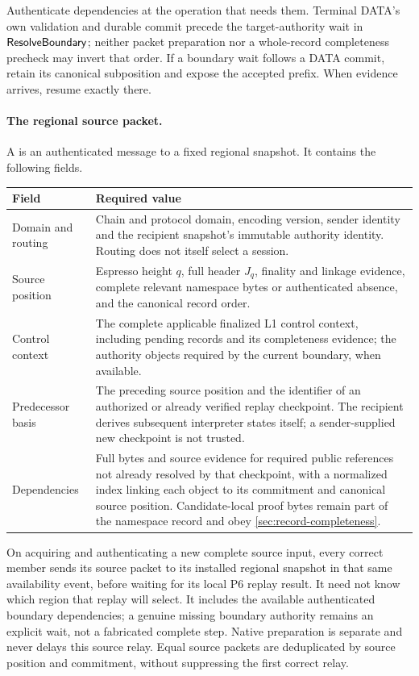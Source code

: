 Authenticate dependencies at the operation that needs them. Terminal
DATA's own validation and durable commit precede the target-authority
wait in $\mathsf{ResolveBoundary}$; neither packet preparation nor a
whole-record completeness precheck may invert that order. If a boundary
wait follows a DATA commit, retain its canonical subposition and expose
the accepted prefix. When evidence arrives, resume exactly there.

\paragraph{The regional source packet.}
A  is an authenticated message to a fixed regional
snapshot. It contains the following fields.
\begin{table}[htbp]\centering\small
\begin{tabularx}{\linewidth}{@{}>{\raggedright\arraybackslash}p{.25\linewidth}Y@{}}\toprule
Field & Required value\\\midrule
Domain and routing & Chain and protocol domain, encoding version,
sender identity and the recipient snapshot's immutable authority
identity. Routing does not itself select a session.\\
Source position & Espresso height $q$, full header $J_q$, finality
and linkage evidence, complete relevant namespace bytes or authenticated
absence, and the canonical record order.\\
Control context & The complete applicable finalized L1 control context,
including pending records and its completeness evidence; the authority
objects required by the current boundary, when available.\\
Predecessor basis & The preceding source position and the identifier of
an authorized or already verified replay checkpoint. The recipient
derives subsequent interpreter states itself; a sender-supplied new
checkpoint is not trusted.\\
Dependencies & Full bytes and source evidence for required public
references not already resolved by that checkpoint, with a normalized
index linking each object to its commitment and canonical source
position. Candidate-local proof bytes remain part of the namespace
record and obey \cref{sec:record-completeness}.\\\bottomrule
\end{tabularx}
\end{table}

On acquiring and authenticating a new complete source input, every
correct member sends its source packet to its installed regional
snapshot in that same availability event, before waiting for its local
P6 replay result. It need not know which region that replay will select.
It includes the available authenticated boundary dependencies; a genuine
missing boundary authority remains an explicit wait, not a fabricated
complete step. Native preparation is separate and never delays this
source relay. Equal source packets are deduplicated by source position
and commitment, without suppressing the first correct relay.

